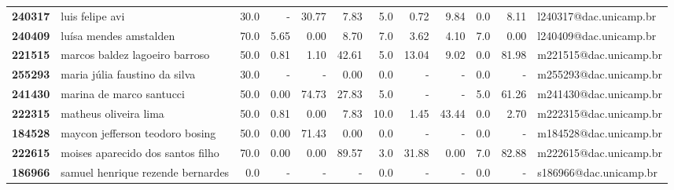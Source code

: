 \documentclass[11pt]{article}
\begin{document}
\begin{center}
\begin{landscape}
\begin{longtable}{llrrrrrrrrrl}
\textbf{240317} &                       luis felipe avi &                  30.0 &           - &       30.77 &        7.83 &                      5.0 &        0.72 &        9.84 &                        0.0 &        8.11 &  l240317@dac.unicamp.br \\
\textbf{240409} &                luísa mendes amstalden &                  70.0 &        5.65 &        0.00 &        8.70 &                      7.0 &        3.62 &        4.10 &                        7.0 &        0.00 &  l240409@dac.unicamp.br \\
\textbf{221515} &        marcos baldez lagoeiro barroso &                  50.0 &        0.81 &        1.10 &       42.61 &                      5.0 &       13.04 &        9.02 &                        0.0 &       81.98 &  m221515@dac.unicamp.br \\
\textbf{255293} &         maria júlia faustino da silva &                  30.0 &           - &           - &        0.00 &                      0.0 &           - &           - &                        0.0 &           - &  m255293@dac.unicamp.br \\
\textbf{241430} &              marina de marco santucci &                  50.0 &        0.00 &       74.73 &       27.83 &                      5.0 &           - &           - &                        5.0 &       61.26 &  m241430@dac.unicamp.br \\
\textbf{222315} &                 matheus oliveira lima &                  50.0 &        0.81 &        0.00 &        7.83 &                     10.0 &        1.45 &       43.44 &                        0.0 &        2.70 &  m222315@dac.unicamp.br \\
\textbf{184528} &       maycon jefferson teodoro bosing &                  50.0 &        0.00 &       71.43 &        0.00 &                      0.0 &           - &           - &                        0.0 &           - &  m184528@dac.unicamp.br \\
\textbf{222615} &     moises aparecido dos santos filho &                  70.0 &        0.00 &        0.00 &       89.57 &                      3.0 &       31.88 &        0.00 &                        7.0 &       82.88 &  m222615@dac.unicamp.br \\
\textbf{186966} &     samuel henrique rezende bernardes &                   0.0 &           - &           - &           - &                      0.0 &           - &           - &                        0.0 &           - &  s186966@dac.unicamp.br \\

\end{longtable}
\end{landscape}
\end{center}
\end{document}
